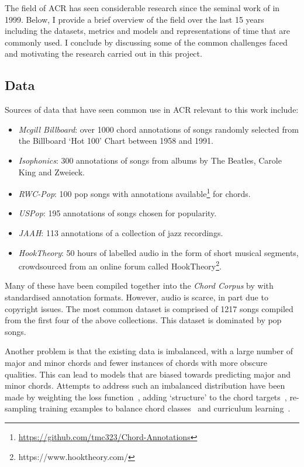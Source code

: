 The field of ACR has seen considerable research since the seminal work of \citet{FujishimaACR} in 1999. Below, I provide a brief overview of the field over the last 15 years including the datasets, metrics and models and representations of time that are commonly used. I conclude by discussing some of the common challenges faced and motivating the research carried out in this project. 

\subsection{Data}\label{sec:background-data}

Sources of data that have seen common use in ACR relevant to this work include:

\begin{itemize}
    \item \emph{Mcgill Billboard}: over 1000 chord annotations of songs randomly selected from the Billboard `Hot 100' Chart between 1958 and 1991.~\citep{McgillBillboard}
    \item \emph{Isophonics}: 300 annotations of songs from albums by The Beatles, Carole King and Zweieck.~\citep{Isophonics}
    \item \emph{RWC-Pop}: 100 pop songs with annotations available\footnote{\url{https://github.com/tmc323/Chord-Annotations}} for chords.~\citep{RWC}
    \item \emph{USPop}: 195 annotations of songs chosen for popularity.~\citep{USPop}
    \item \emph{JAAH}: 113 annotations of a collection of jazz recordings.~\citep{JAAH}
    \item \emph{HookTheory}: 50 hours of labelled audio in the form of short musical segments, crowdsourced from an online forum called HookTheory\footnote{https://www.hooktheory.com/}.~\citep{MelodyTranscriptionViaGenerativePreTraining}
\end{itemize}

Many of these have been compiled together into the \emph{Chord Corpus} by \citet{Choco} with standardised annotation formats. However, audio is scarce, in part due to copyright issues. The most common dataset is comprised of 1217 songs compiled from the first four of the above collections. This dataset is dominated by pop songs.

Another problem is that the existing data is imbalanced, with a large number of major and minor chords and fewer instances of chords with more obscure qualities. This can lead to models that are biased towards predicting major and minor chords. Attempts to address such an imbalanced distribution have been made by weighting the loss function~\citep{ACRLargeVocab1}, adding `structure' to the chord targets~\citep{StructuredTraining,ACRLargeVocab1}, re-sampling training examples to balance chord classes~\citep{BalanceRandomForestACR} and curriculum learning~\citep{CurriculumLearning}.

